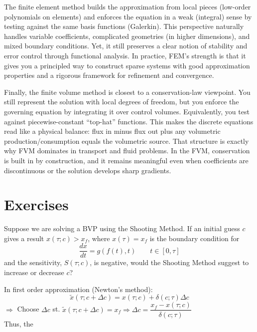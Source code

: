 The finite element method builds the approximation from local pieces (low-order polynomials on elements) and enforces the equation in a weak (integral) sense by testing against the same basis functions (Galerkin). This perspective naturally handles variable coefficients, complicated geometries (in higher dimensions), and mixed boundary conditions. Yet, it still preserves a clear notion of stability and error control through functional analysis. In practice, FEM's strength is that it gives you a principled way to construct sparse systems with good approximation properties and a rigorous framework for refinement and convergence.

Finally, the finite volume method is closest to a conservation-law viewpoint. You still represent the solution with local degrees of freedom, but you enforce the governing equation by integrating it over control volumes. Equivalently, you test against piecewise-constant ``top-hat'' functions. This makes the discrete equations read like a physical balance: flux in minus flux out plus any volumetric production/consumption equals the volumetric source. That structure is exactly why FVM dominates in transport and fluid problems. In the FVM, conservation is built in by construction, and it remains meaningful even when coefficients are discontinuous or the solution develops sharp gradients.

\section{Exercises}

\begin{exercise} %
    Suppose we are solving a BVP using the Shooting Method. If an initial guess $c$ gives a result $x(\tau; c) > x_f$, where $x(\tau) = x_f$ is the boundary condition for
    \[
        \frac{dx}{dt} = g(f(t), t)\qquad t\in [0,\tau]
    \]
    and the sensitivity, $S(\tau; c)$, is negative, would the Shooting Method suggest to increase or decrease $c$?
\end{exercise}

\begin{solution}
    In first order approximation (Newton's method):
    \[
        \tilde{x}(\tau;c+\Delta c) = x(\tau; c) + \delta(c;\tau)\Delta c
    \]
    \(\Rightarrow\) Choose \(\Delta c\) st. \(\tilde{x}(\tau;c+\Delta c) = x_f \Rightarrow \Delta c = \dfrac{x_f-x(\tau;c)}{\delta(c;\tau)}\)\\
    Thus, the 
\end{solution}

